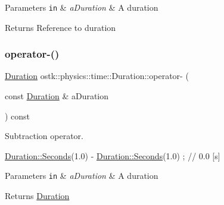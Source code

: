 \begin{DoxyParams}[1]{Parameters}
\mbox{\tt in}  & {\em a\+Duration} & A duration \\
\hline
\end{DoxyParams}
\begin{DoxyReturn}{Returns}
Reference to duration 
\end{DoxyReturn}
\mbox{\label{classostk_1_1physics_1_1time_1_1_duration_a211f0f909d453c61aad6677409507698}} 
\subsubsection{\texorpdfstring{operator-\/()}{operator-()}\hspace{0.1cm}{\footnotesize\ttfamily [1/2]}}
{\footnotesize\ttfamily \hyperlink{classostk_1_1physics_1_1time_1_1_duration}{Duration} ostk\+::physics\+::time\+::\+Duration\+::operator-\/ (\begin{DoxyParamCaption}\item[{const \hyperlink{classostk_1_1physics_1_1time_1_1_duration}{Duration} \&}]{a\+Duration }\end{DoxyParamCaption}) const}



Subtraction operator. 


\begin{DoxyCode}
\hyperlink{classostk_1_1physics_1_1time_1_1_duration_ad973fa34fcc308fdcc8d50c3ee694764}{Duration::Seconds}(1.0) - \hyperlink{classostk_1_1physics_1_1time_1_1_duration_ad973fa34fcc308fdcc8d50c3ee694764}{Duration::Seconds}(1.0) ; \textcolor{comment}{// 0.0 [s]}
\end{DoxyCode}



\begin{DoxyParams}[1]{Parameters}
\mbox{\tt in}  & {\em a\+Duration} & A duration \\
\hline
\end{DoxyParams}
\begin{DoxyReturn}{Returns}
\hyperlink{classostk_1_1physics_1_1time_1_1_duration}{Duration} 
\end{DoxyReturn}
\mbox{\label{classostk_1_1physics_1_1time_1_1_duration_ad6311a658bac277c9739cf938106a274}} 
